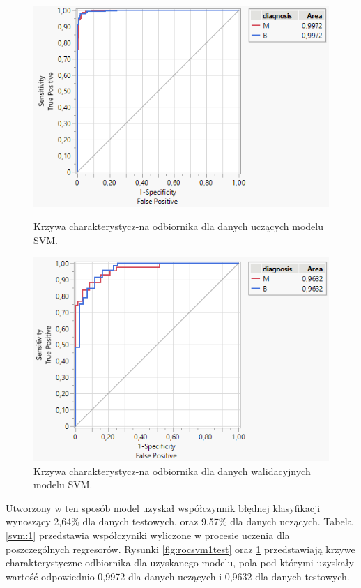 \begin{figure}[!ht]
	\begin{minipage}{0.48\textwidth}
		\centering
		\includegraphics[width=0.98\linewidth]{Rysunki/Rozdzial3/roc_svm1_test}
		\caption{Krzywa charakterystycz-na odbiornika dla danych uczących modelu SVM.}
		\label{fig:rocsvm1test}		
	\end{minipage}%
	\hspace{10pt}
	\begin{minipage}{0.48\textwidth}
		\centering
		\includegraphics[width=0.98\linewidth]{Rysunki/Rozdzial3/roc_svm1_val}
		\caption{Krzywa charakterystycz-na odbiornika dla danych walidacyjnych modelu SVM.}
		\label{fig:rocsvm1val}				
	\end{minipage}	
\end{figure}

Utworzony w ten sposób model uzyskał współczynnik błędnej klasyfikacji wynoszący 2,64\% dla danych testowych, oraz 9,57\% dla danych uczących. Tabela \ref{svm:1} przedstawia współczyniki wyliczone w procesie uczenia dla poszczególnych regresorów. Rysunki \ref{fig:rocsvm1test} oraz \ref{fig:rocsvm1val} przedstawiają krzywe charakterystyczne odbiornika dla uzyskanego modelu, pola pod którymi uzyskały wartość odpowiednio 0,9972 dla danych uczących i 0,9632 dla danych testowych.

